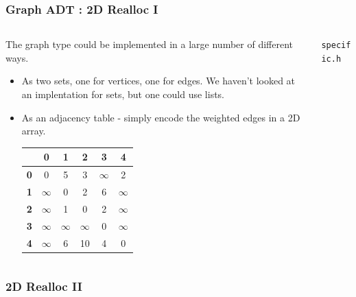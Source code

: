 
\begin{frame}[fragile]
\frametitle{Graph ADT : 2D Realloc I}
\begin{columns}[T]

\begin{column}{0.55\textwidth}
The graph type could be implemented in a large number
of different ways.
\begin{itemize}[<+->]
\item As two sets, one for vertices, one for edges.
We haven't looked at an implentation for sets, but one could use lists.
\item As an adjacency table - simply encode the weighted edges in a 2D array.
\begin{center}
\begin{tabular}{|c|ccccc|}\hline
& {\bf 0} & {\bf 1} & {\bf 2} & {\bf 3} & {\bf 4} \\ \hline
{\bf 0} & 0 & 5 & 3 & $\infty$ & 2 \\
{\bf 1} & $\infty$ & 0 & 2 & 6 & $\infty$ \\
{\bf 2} & $\infty$ & 1 & 0 & 2 & $\infty$ \\
{\bf 3} & $\infty$ &$\infty$ &$\infty$ & 0 & $\infty$ \\
{\bf 4} & $\infty$ & 6 & 10 & 4 & 0 \\ \hline
\end{tabular}
\end{center}
\end{itemize}
\end{column}

\pause
\begin{column}{0.35\textwidth}
\verb^specific.h^

\end{column}

\end{columns}
\end{frame}


\begin{frame}[fragile]
\frametitle{2D Realloc II}
\begin{columns}[T]

\begin{column}{0.50\textwidth}

\end{column}

\pause
\begin{column}{0.45\textwidth}

\end{column}


\end{columns}
\end{frame}

